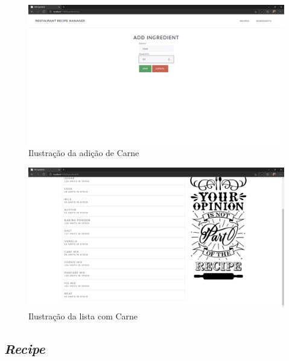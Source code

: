 \FloatBarrier
\begin{figure}[!hbt]
    \centering
    \includegraphics[width=14cm]{Resources/WebApp/Ingredients/ingredient (7).png}
    \caption{Ilustração da adição de Carne}
    
\end{figure}
\FloatBarrier
\begin{figure}[!hbt]
    \centering
    \includegraphics[width=14cm]{Resources/WebApp/Ingredients/ingredient (8).png}
    \caption{Ilustração da lista com Carne}
    
\end{figure}
\FloatBarrier

\newpage
\subsection{\textit{Recipe}}

